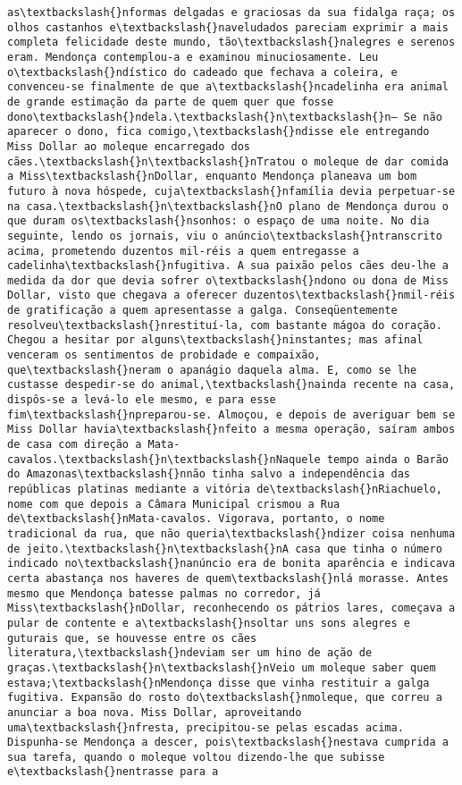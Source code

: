 \begin{Verbatim}[commandchars=\\\{\}]
as\textbackslash{}nformas delgadas e graciosas da sua fidalga raça; os olhos castanhos e\textbackslash{}naveludados pareciam exprimir a mais completa felicidade deste mundo, tão\textbackslash{}nalegres e serenos eram. Mendonça contemplou-a e examinou minuciosamente. Leu o\textbackslash{}ndístico do cadeado que fechava a coleira, e convenceu-se finalmente de que a\textbackslash{}ncadelinha era animal de grande estimação da parte de quem quer que fosse dono\textbackslash{}ndela.\textbackslash{}n\textbackslash{}n— Se não aparecer o dono, fica comigo,\textbackslash{}ndisse ele entregando Miss Dollar ao moleque encarregado dos cães.\textbackslash{}n\textbackslash{}nTratou o moleque de dar comida a Miss\textbackslash{}nDollar, enquanto Mendonça planeava um bom futuro à nova hóspede, cuja\textbackslash{}nfamília devia perpetuar-se na casa.\textbackslash{}n\textbackslash{}nO plano de Mendonça durou o que duram os\textbackslash{}nsonhos: o espaço de uma noite. No dia seguinte, lendo os jornais, viu o anúncio\textbackslash{}ntranscrito acima, prometendo duzentos mil-réis a quem entregasse a cadelinha\textbackslash{}nfugitiva. A sua paixão pelos cães deu-lhe a medida da dor que devia sofrer o\textbackslash{}ndono ou dona de Miss Dollar, visto que chegava a oferecer duzentos\textbackslash{}nmil-réis de gratificação a quem apresentasse a galga. Conseqüentemente resolveu\textbackslash{}nrestituí-la, com bastante mágoa do coração. Chegou a hesitar por alguns\textbackslash{}ninstantes; mas afinal venceram os sentimentos de probidade e compaixão, que\textbackslash{}neram o apanágio daquela alma. E, como se lhe custasse despedir-se do animal,\textbackslash{}nainda recente na casa, dispôs-se a levá-lo ele mesmo, e para esse fim\textbackslash{}npreparou-se. Almoçou, e depois de averiguar bem se Miss Dollar havia\textbackslash{}nfeito a mesma operação, saíram ambos de casa com direção a Mata-cavalos.\textbackslash{}n\textbackslash{}nNaquele tempo ainda o Barão do Amazonas\textbackslash{}nnão tinha salvo a independência das repúblicas platinas mediante a vitória de\textbackslash{}nRiachuelo, nome com que depois a Câmara Municipal crismou a Rua de\textbackslash{}nMata-cavalos. Vigorava, portanto, o nome tradicional da rua, que não queria\textbackslash{}ndizer coisa nenhuma de jeito.\textbackslash{}n\textbackslash{}nA casa que tinha o número indicado no\textbackslash{}nanúncio era de bonita aparência e indicava certa abastança nos haveres de quem\textbackslash{}nlá morasse. Antes mesmo que Mendonça batesse palmas no corredor, já Miss\textbackslash{}nDollar, reconhecendo os pátrios lares, começava a pular de contente e a\textbackslash{}nsoltar uns sons alegres e guturais que, se houvesse entre os cães literatura,\textbackslash{}ndeviam ser um hino de ação de graças.\textbackslash{}n\textbackslash{}nVeio um moleque saber quem estava;\textbackslash{}nMendonça disse que vinha restituir a galga fugitiva. Expansão do rosto do\textbackslash{}nmoleque, que correu a anunciar a boa nova. Miss Dollar, aproveitando uma\textbackslash{}nfresta, precipitou-se pelas escadas acima. Dispunha-se Mendonça a descer, pois\textbackslash{}nestava cumprida a sua tarefa, quando o moleque voltou dizendo-lhe que subisse e\textbackslash{}nentrasse para a 
\end{Verbatim}
